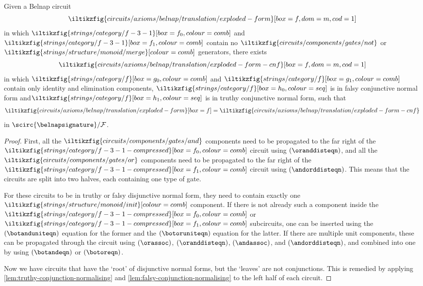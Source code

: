 \begin{proposition}\label{prop:disjunctive-normal-form}
    Given a Belnap circuit \[
        \iltikzfig{circuits/axioms/belnap/translation/exploded-form}[box=f,dom=m,cod=1]
    \] in which \(
    \iltikzfig{strings/category/f-3-1}[box=f_0,colour=comb]
    \) and \(
    \iltikzfig{strings/category/f-3-1}[box=f_1,colour=comb]
    \) contain no \(
    \iltikzfig{circuits/components/gates/not}
    \) or \(
    \iltikzfig{strings/structure/monoid/merge}[colour=comb]
    \) generators, there exists \[
        \iltikzfig{circuits/axioms/belnap/translation/exploded-form-cnf}[box=f,dom=m,cod=1]
    \] in which \(
    \iltikzfig{strings/category/f}[box=g_0,colour=comb]
    \) and \(
    \iltikzfig{strings/category/f}[box=g_1,colour=comb]
    \) contain only identity and elimination components,
    \(
    \iltikzfig{strings/category/f}[box=h_0,colour=seq]
    \) is in falsy conjunctive normal form and\(
    \iltikzfig{strings/category/f}[box=h_1,colour=seq]
    \) is in truthy conjunctive normal form, such that \[
        \iltikzfig{circuits/axioms/belnap/translation/exploded-form}[box=f]
        =
        \iltikzfig{circuits/axioms/belnap/translation/exploded-form-cnf}
    \] in \(
    \scirc{\belnapsignature} / \mathcal{F}
    \).
\end{proposition}
\begin{proof}
    First, all the \(
    \iltikzfig{circuits/components/gates/and}
    \) components need to be propagated to the far right of the \(
    \iltikzfig{strings/category/f-3-1-compressed}[box=f_0,colour=comb]
    \) circuit using \((\oranddisteqn)\), and all the \(
    \iltikzfig{circuits/components/gates/or}
    \) components need to be propagated to the far right of the \(
    \iltikzfig{strings/category/f-3-1-compressed}[box=f_1,colour=comb]
    \) circuit using \((\andorddisteqn)\).
    This means that the circuits are split into two halves, each containing
    one type of gate.

    For these circuits to be in truthy or falsy disjunctive normal form, they
    need to contain exactly one \(
    \iltikzfig{strings/structure/monoid/init}[colour=comb]
    \) component.
    If there is not already such a component inside the \(
    \iltikzfig{strings/category/f-3-1-compressed}[box=f_0,colour=comb]
    \) or \(
    \iltikzfig{strings/category/f-3-1-compressed}[box=f_1,colour=comb]
    \) subcircuits, one can be inserted using the \((\botanduniteqn)\) equation
    for the former and the \((\botoruniteqn)\) equation for the latter.
    If there are multiple unit components, these can be propagated through the
    circuit using \((\orassoc)\), \((\oranddisteqn)\), \((\andassoc)\), and
    \((\andorddisteqn)\), and combined into one by using \((\botandeqn)\) or
    \((\botoreqn)\).

    Now we have circuits that have the `root' of disjunctive normal forms, but
    the `leaves' are not conjunctions.
    This is remedied by applying \cref{lem:truthy-conjunction-normalising} and
    \cref{lem:falsy-conjunction-normalising} to the left half of each circuit.
\end{proof}

